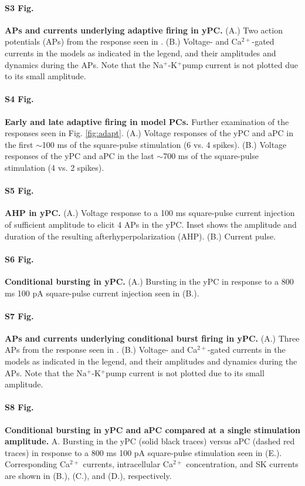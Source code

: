 \documentclass[10pt,letterpaper]{article}
\newcommand{\Ca}{Ca$^{2+}$}
\newcommand{\K}{K$^{+}$}
\newcommand{\Na}{Na$^{+}$}
\begin{document}
\paragraph*{S3 Fig.}
\label{S3_Fig}
{\bf APs and currents underlying adaptive firing in yPC.} (A.) Two action potentials (APs) from the response seen in . (B.) Voltage- and \Ca-gated currents in the models as indicated in the legend, and their amplitudes and dynamics during the APs. Note that the \Na-\K pump current is not plotted due to its small amplitude.

\paragraph*{S4 Fig.}
\label{S4_Fig}
{\bf Early and late adaptive firing in model PCs.} Further examination of the responses seen in Fig. \ref{fig:adapt}. (A.) Voltage responses of the yPC and aPC in the first $\sim$100 ms of the square-pulse stimulation (6 vs. 4 spikes). (B.) Voltage responses of the yPC and aPC in the last $\sim$700 ms of the square-pulse stimulation (4 vs. 2 spikes). 

\paragraph*{S5 Fig.}
\label{S5_Fig}
{\bf AHP in yPC.} (A.) Voltage response to a 100 ms square-pulse current injection of sufficient amplitude to elicit 4 APs in the yPC. Inset shows the amplitude and duration of the resulting afterhyperpolarization (AHP). (B.) Current pulse.

\paragraph*{S6 Fig.}
\label{S6_Fig}
{\bf Conditional bursting in yPC.} (A.) Bursting in the yPC in response to a 800 ms 100 pA square-pulse current injection seen in (B.).

\paragraph*{S7 Fig.}
\label{S7_Fig}
{\bf APs and currents underlying conditional burst firing in yPC.} (A.) Three APs from the response seen in . (B.) Voltage- and \Ca-gated currents in the models as indicated in the legend, and their amplitudes and dynamics during the APs. Note that the \Na-\K pump current is not plotted due to its small amplitude.

\paragraph*{S8 Fig.}
\label{S8_Fig}
{\bf Conditional bursting in yPC and aPC compared at a single stimulation amplitude.} A. Bursting in the yPC (solid black traces) versus aPC (dashed red traces) in response to a 800 ms 100 pA square-pulse stimulation seen in (E.). Corresponding {\Ca} currents, intracellular {\Ca} concentration, and SK currents are shown in (B.), (C.), and (D.), respectively.
\end{document}
